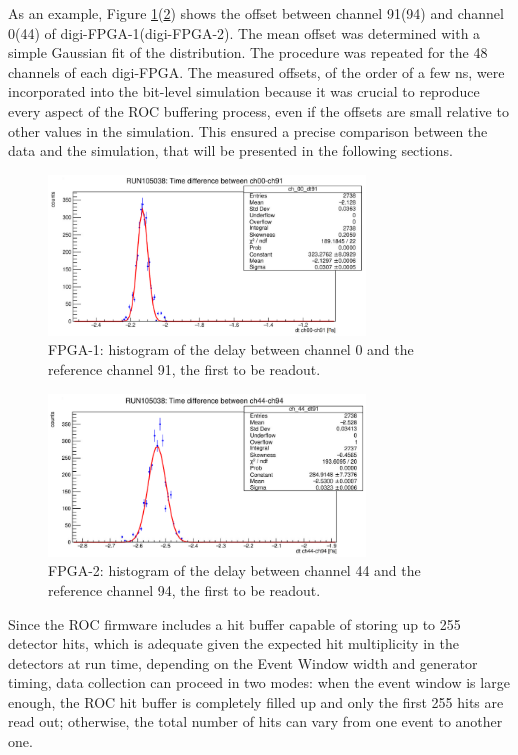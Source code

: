 As an example, Figure \ref{fig:delay1}(\ref{fig:delay2}) shows the offset between 
channel 91(94) and channel 0(44) of digi-FPGA-1(digi-FPGA-2). 
The mean offset was determined with a simple Gaussian fit of the distribution. 
The procedure was repeated for the 48 channels of each digi-FPGA.
The measured offsets, of the order of a few ns, were incorporated 
into the bit-level simulation because it was crucial to reproduce 
every aspect of the ROC buffering process, even if the offsets 
are small relative to other values in the simulation. This ensured a precise 
comparison between the data and the simulation, that will be 
presented in the following sections.
  \begin{figure}[!h]
          \centering
      \includegraphics[width=0.75\textwidth]{figures/png/Screenshot from 2023-12-03 11-50-50.png}
      \caption{FPGA-1: histogram of the delay between channel 0 and the reference channel 91, the first to be readout.}
      \label{fig:delay1}
    \end{figure}
    \begin{figure}[!h]
          \centering
      \includegraphics[width=0.75\textwidth]{figures/png/Screenshot from 2023-12-03 11-50-33.png}
      \caption{FPGA-2: histogram of the delay between channel 44 and the reference channel 94, the first to be readout.}
      \label{fig:delay2}
    \end{figure}
    Since the ROC firmware includes a hit buffer capable of storing up to 
    255 detector hits, which is adequate given the expected hit multiplicity 
    in the detectors at run time, depending on the Event Window width and generator timing, 
    data collection can proceed in two modes: when the event window is large enough, 
    the ROC hit buffer is completely filled up and only the first 255 hits are read out; 
    otherwise, the total number of hits can vary from one event to another one.


